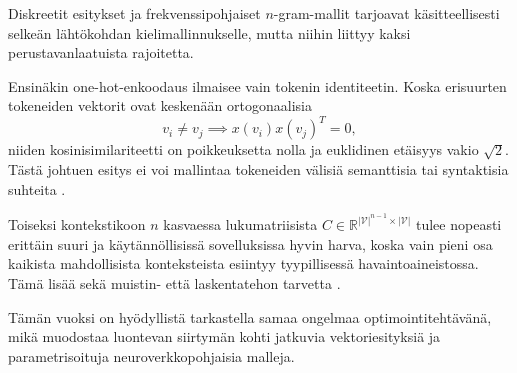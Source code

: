 Diskreetit esitykset ja frekvenssipohjaiset \(n\)-gram-mallit tarjoavat
käsitteellisesti selkeän lähtökohdan kielimallinnukselle, mutta niihin liittyy
kaksi perustavanlaatuista rajoitetta.

Ensinäkin one-hot-enkoodaus ilmaisee vain tokenin identiteetin. Koska erisuurten tokeneiden vektorit ovat keskenään ortogonaalisia
\[
  v_i \neq v_j \implies x(v_i) x(v_j)^T = 0,
\]
niiden kosinisimilariteetti on poikkeuksetta nolla ja euklidinen etäisyys vakio \(\sqrt{2}\). Tästä johtuen esitys ei voi mallintaa tokeneiden välisiä semanttisia tai syntaktisia suhteita \cite{mikolov2013efficient}.

Toiseksi kontekstikoon \(n\) kasvaessa lukumatriisista
\(C \in \mathbb{R}^{|\mathcal{V}|^{n-1} \times |\mathcal{V}|}\) tulee nopeasti erittäin suuri ja
käytännöllisissä sovelluksissa hyvin harva, koska vain pieni osa kaikista
mahdollisista konteksteista esiintyy tyypillisessä havaintoaineistossa. Tämä
lisää sekä muistin- että laskentatehon tarvetta
\cite{jurafsky2023speech}.

Tämän vuoksi on hyödyllistä tarkastella samaa ongelmaa
optimointitehtävänä, mikä muodostaa luontevan siirtymän kohti jatkuvia
vektoriesityksiä ja parametrisoituja neuroverkkopohjaisia malleja.
